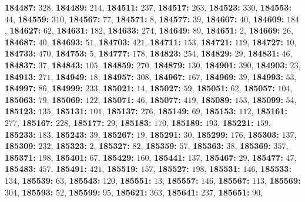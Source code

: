 \textsf{\bfseries 184487:} $328$, \textsf{\bfseries 184489:} $214$, \textsf{\bfseries 184511:} $237$, \textsf{\bfseries 184517:} $263$, \textsf{\bfseries 184523:} $330$, \textsf{\bfseries 184553:} $44$, \textsf{\bfseries 184559:} $310$, \textsf{\bfseries 184567:} $77$, \textsf{\bfseries 184571:} $8$, \textsf{\bfseries 184577:} $39$, \textsf{\bfseries 184607:} $40$, \textsf{\bfseries 184609:} $184$, \textsf{\bfseries 184627:} $62$, \textsf{\bfseries 184631:} $182$, \textsf{\bfseries 184633:} $274$, \textsf{\bfseries 184649:} $89$, \textsf{\bfseries 184651:} $2$, \textsf{\bfseries 184669:} $26$, \textsf{\bfseries 184687:} $40$, \textsf{\bfseries 184693:} $51$, \textsf{\bfseries 184703:} $421$, \textsf{\bfseries 184711:} $153$, \textsf{\bfseries 184721:} $119$, \textsf{\bfseries 184727:} $10$, \textsf{\bfseries 184733:} $470$, \textsf{\bfseries 184753:} $5$, \textsf{\bfseries 184777:} $178$, \textsf{\bfseries 184823:} $254$, \textsf{\bfseries 184829:} $29$, \textsf{\bfseries 184831:} $46$, \textsf{\bfseries 184837:} $37$, \textsf{\bfseries 184843:} $105$, \textsf{\bfseries 184859:} $270$, \textsf{\bfseries 184879:} $130$, \textsf{\bfseries 184901:} $390$, \textsf{\bfseries 184903:} $23$, \textsf{\bfseries 184913:} $271$, \textsf{\bfseries 184949:} $18$, \textsf{\bfseries 184957:} $308$, \textsf{\bfseries 184967:} $167$, \textsf{\bfseries 184969:} $39$, \textsf{\bfseries 184993:} $53$, \textsf{\bfseries 184997:} $86$, \textsf{\bfseries 184999:} $233$, \textsf{\bfseries 185021:} $14$, \textsf{\bfseries 185027:} $59$, \textsf{\bfseries 185051:} $62$, \textsf{\bfseries 185057:} $104$, \textsf{\bfseries 185063:} $79$, \textsf{\bfseries 185069:} $122$, \textsf{\bfseries 185071:} $46$, \textsf{\bfseries 185077:} $419$, \textsf{\bfseries 185089:} $153$, \textsf{\bfseries 185099:} $54$, \textsf{\bfseries 185123:} $135$, \textsf{\bfseries 185131:} $101$, \textsf{\bfseries 185137:} $276$, \textsf{\bfseries 185149:} $69$, \textsf{\bfseries 185153:} $112$, \textsf{\bfseries 185161:} $277$, \textsf{\bfseries 185167:} $228$, \textsf{\bfseries 185177:} $29$, \textsf{\bfseries 185183:} $170$, \textsf{\bfseries 185189:} $193$, \textsf{\bfseries 185221:} $159$, \textsf{\bfseries 185233:} $183$, \textsf{\bfseries 185243:} $39$, \textsf{\bfseries 185267:} $19$, \textsf{\bfseries 185291:} $30$, \textsf{\bfseries 185299:} $176$, \textsf{\bfseries 185303:} $137$, \textsf{\bfseries 185309:} $232$, \textsf{\bfseries 185323:} $2$, \textsf{\bfseries 185327:} $82$, \textsf{\bfseries 185359:} $57$, \textsf{\bfseries 185363:} $38$, \textsf{\bfseries 185369:} $357$, \textsf{\bfseries 185371:} $198$, \textsf{\bfseries 185401:} $67$, \textsf{\bfseries 185429:} $160$, \textsf{\bfseries 185441:} $137$, \textsf{\bfseries 185467:} $29$, \textsf{\bfseries 185477:} $47$, \textsf{\bfseries 185483:} $457$, \textsf{\bfseries 185491:} $421$, \textsf{\bfseries 185519:} $157$, \textsf{\bfseries 185527:} $198$, \textsf{\bfseries 185531:} $146$, \textsf{\bfseries 185533:} $134$, \textsf{\bfseries 185539:} $63$, \textsf{\bfseries 185543:} $120$, \textsf{\bfseries 185551:} $13$, \textsf{\bfseries 185557:} $146$, \textsf{\bfseries 185567:} $113$, \textsf{\bfseries 185569:} $304$, \textsf{\bfseries 185593:} $52$, \textsf{\bfseries 185599:} $95$, \textsf{\bfseries 185621:} $363$, \textsf{\bfseries 185641:} $237$, \textsf{\bfseries 185651:} $90$, 

